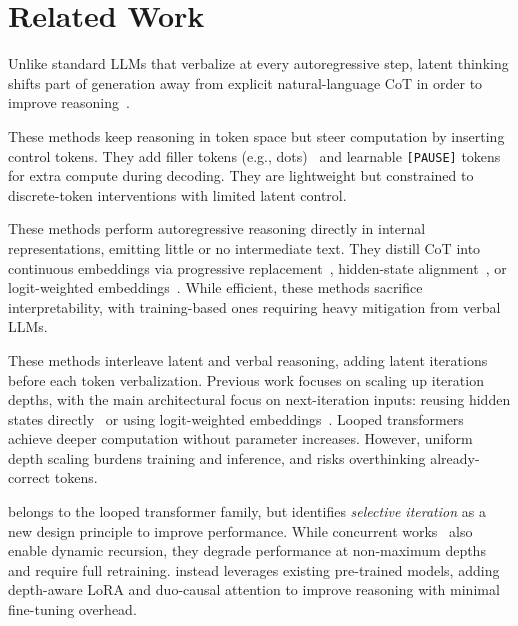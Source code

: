 \section{Related Work}
\label{sec:related_work}
Unlike standard LLMs that verbalize at every autoregressive step, latent thinking shifts part of generation away from explicit natural-language CoT in order to improve reasoning~\citep{li2025implicit}.

These methods keep reasoning in token space but steer computation by inserting control tokens.
They add filler tokens (e.g., dots)~\citep{pfau2404let} and learnable \texttt{[PAUSE]} tokens~\citep{goyal2310think,kim2025learning} for extra compute during decoding.
They are lightweight but constrained to discrete-token interventions with limited latent control.

These methods perform autoregressive reasoning directly in internal representations, emitting little or no intermediate text.
They distill CoT into continuous embeddings via progressive replacement~\citep{hao2024training, cheng2024compressed}, hidden-state alignment~\citep{su2025token, liu2024expediting}, or logit-weighted embeddings~\citep{zhang2025soft}.
While efficient, these methods sacrifice interpretability, with training-based ones requiring heavy mitigation from verbal LLMs.

These methods interleave latent and verbal reasoning, adding latent iterations before each token verbalization.
Previous work focuses on scaling up iteration depths, with the main architectural focus on next-iteration inputs: reusing hidden states directly~\citep{saunshi2025loopedTrans,geiping2025scaling,zhu2025ouro} or using logit-weighted embeddings~\citep{zeng2025pondering}.
Looped transformers achieve deeper computation without parameter increases. However, uniform depth scaling burdens training and inference, and risks overthinking already-correct tokens.

\name belongs to the looped transformer family, but identifies \emph{selective iteration} as a new design principle to improve performance.
While concurrent works~\citep{bae2025mor, zhu2025ouro} also enable dynamic recursion, they degrade performance at non-maximum depths and require full retraining.
\name instead leverages existing pre-trained models, adding depth-aware LoRA and duo-causal attention to improve reasoning with minimal fine-tuning overhead.
